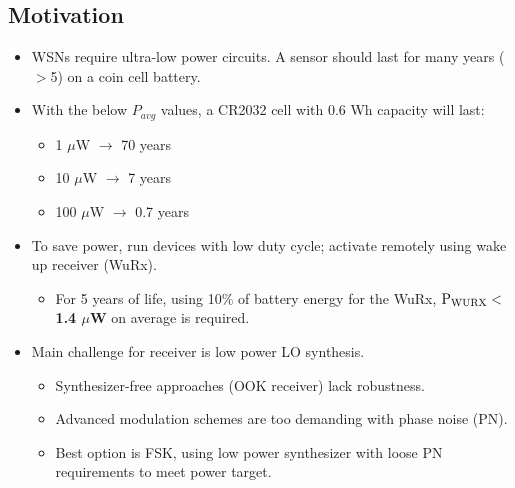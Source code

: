 \documentclass[10pt,a4paper]{article}
\begin{document}
		\subsection{Motivation}
		\begin{itemize}
			\footnotesize
			\item WSNs require ultra-low power circuits. A sensor should last for many years ($>$5) on a coin cell battery.
			\item With the below $P_{avg}$ values, a CR2032 cell with 0.6 Wh capacity will last:
			\begin{itemize}
				\scriptsize
				\item 1 $\mu$W $\rightarrow$ 70 years
				\item 10 $\mu$W $\rightarrow$ 7 years
				\item 100 $\mu$W $\rightarrow$ 0.7 years
			\end{itemize} 
			\item To save power, run devices with low duty cycle; activate remotely using wake up receiver (WuRx).
			\begin{itemize}
				\scriptsize
				\item For 5 years of life, using 10\% of battery energy for the WuRx, \textbf{$\textnormal{P}_{\textnormal{WURX}} <$ 1.4 $\mu$W} on average is required.
			\end{itemize} 
			\item Main challenge for receiver is low power LO synthesis.
			\begin{itemize}
				\scriptsize
				\item Synthesizer-free approaches (OOK receiver) lack robustness.
				\item Advanced modulation schemes are too demanding with phase noise (PN).
				\item Best option is FSK, using low power synthesizer with loose PN requirements to meet power target.
			\end{itemize} 
		\end{itemize}  

		\flushleft
\end{document}

